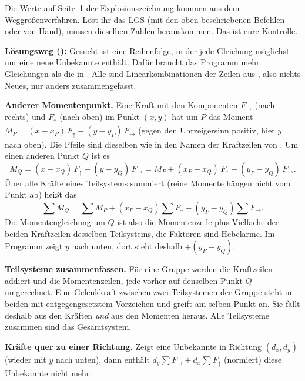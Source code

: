 Die Werte auf Seite~1 der Explosionszeichnung kommen aus dem Weggrößenverfahren. Löst ihr das LGS
(mit den oben beschriebenen Befehlen oder von Hand), müssen dieselben Zahlen herauskommen. Das ist
eure Kontrolle.

\textbf{Lösungsweg ():} Gesucht ist eine Reihenfolge, in der jede Gleichung möglichst
nur eine neue Unbekannte enthält. Dafür braucht das Programm mehr Gleichungen als die in .
Alle sind Linearkombinationen der Zeilen aus , also nichts Neues, nur anders
zusammengefasst.

\textbf{Anderer Momentenpunkt.} Eine Kraft mit den Komponenten $F_\rightarrow$ (nach rechts) und
$F_\uparrow$ (nach oben) im Punkt $(x, y)$ hat um $P$ das Moment
$M_P = (x - x_P)\,F_\uparrow - (y - y_P)\,F_\rightarrow$ (gegen den Uhrzeigersinn positiv, hier $y$
nach oben). Die Pfeile sind dieselben wie in den Namen der Kraftzeilen von . Um einen
anderen Punkt $Q$ ist es
\[
  M_Q = (x - x_Q)\,F_\uparrow - (y - y_Q)\,F_\rightarrow
      = M_P + (x_P - x_Q)\,F_\uparrow - (y_P - y_Q)\,F_\rightarrow .
\]
Über alle Kräfte eines Teilsystems summiert (reine Momente hängen nicht vom Punkt ab) heißt das
\[
  \textstyle\sum M_Q = \sum M_P + (x_P - x_Q) \sum F_\uparrow - (y_P - y_Q) \sum F_\rightarrow .
\]
Die Momentengleichung um $Q$ ist also die Momentenzeile plus Vielfache der beiden Kraftzeilen
desselben Teilsystems, die Faktoren sind Hebelarme. Im Programm zeigt $y$ nach unten, dort steht
deshalb $+(y_P - y_Q)$.

\textbf{Teilsysteme zusammenfassen.} Für eine Gruppe werden die Kraftzeilen addiert und die
Momentenzeilen, jede vorher auf denselben Punkt $Q$ umgerechnet. Eine Gelenkkraft zwischen zwei
Teilsystemen der Gruppe steht in beiden mit entgegengesetztem Vorzeichen und greift am selben Punkt
an. Sie fällt deshalb aus den Kräften \emph{und} aus den Momenten heraus. Alle Teilsysteme zusammen
sind das Gesamtsystem.

\textbf{Kräfte quer zu einer Richtung.} Zeigt eine Unbekannte in Richtung $(d_x, d_y)$ (wieder mit $y$
nach unten), dann enthält $d_y \sum F_\rightarrow + d_x \sum F_\uparrow$ (normiert) diese Unbekannte
nicht mehr.

